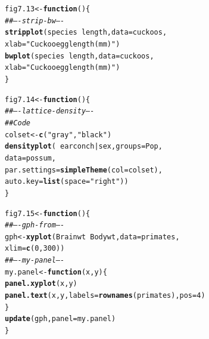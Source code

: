 \documentclass[12pt, a4paper,  BCOR=8.25mm, DIV=15]{scrartcl}\usepackage[]{graphicx}\usepackage[]{color}
\makeatletter
\newcommand{\hlnum}[1]{\textcolor[rgb]{0.686,0.059,0.569}{#1}}%
\newcommand{\hlstr}[1]{\textcolor[rgb]{0.192,0.494,0.8}{#1}}%
\newcommand{\hlcom}[1]{\textcolor[rgb]{0.678,0.584,0.686}{\textit{#1}}}%
\newcommand{\hlopt}[1]{\textcolor[rgb]{0,0,0}{#1}}%
\newcommand{\hlstd}[1]{\textcolor[rgb]{0.345,0.345,0.345}{#1}}%
\newcommand{\hlkwa}[1]{\textcolor[rgb]{0.161,0.373,0.58}{\textbf{#1}}}%
\newcommand{\hlkwb}[1]{\textcolor[rgb]{0.69,0.353,0.396}{#1}}%
\newcommand{\hlkwc}[1]{\textcolor[rgb]{0.333,0.667,0.333}{#1}}%
\newcommand{\hlkwd}[1]{\textcolor[rgb]{0.737,0.353,0.396}{\textbf{#1}}}%
\newenvironment{kframe}{%
 \def\at@end@of@kframe{}%
 \ifinner\ifhmode%
  \def\at@end@of@kframe{\end{minipage}}%
  \begin{minipage}{\columnwidth}%
 \fi\fi%
 \def\FrameCommand##1{\hskip\@totalleftmargin \hskip-\fboxsep
 \colorbox{shadecolor}{##1}\hskip-\fboxsep
     \hskip-\linewidth \hskip-\@totalleftmargin \hskip\columnwidth}%
 \MakeFramed {\advance\hsize-\width
   \@totalleftmargin\z@ \linewidth\hsize
   \@setminipage}}%
 {\par\unskip\endMakeFramed%
 \at@end@of@kframe}
\newenvironment{knitrout}{}{} %
\makeatother
\begin{document}
\begin{knitrout}
\color{fgcolor}\begin{kframe}
\begin{alltt}
\hlstd{fig7.13} \hlkwb{<-} \hlkwa{function}\hlstd{()\{}
\hlcom{## ---- strip-bw ----}
\hlkwd{stripplot}\hlstd{(species} \hlopt{~} \hlstd{length,} \hlkwc{data}\hlstd{=cuckoos,}
          \hlkwc{xlab}\hlstd{=}\hlstr{"Cuckoo egg length (mm)"}\hlstd{)}
\hlkwd{bwplot}\hlstd{(species} \hlopt{~} \hlstd{length,} \hlkwc{data}\hlstd{=cuckoos,}
       \hlkwc{xlab}\hlstd{=}\hlstr{"Cuckoo egg length (mm)"}\hlstd{)}
\hlstd{\}}
\end{alltt}
\end{kframe}
\end{knitrout}

\begin{knitrout}
\color{fgcolor}\begin{kframe}
\begin{alltt}
\hlstd{fig7.14} \hlkwb{<-} \hlkwa{function}\hlstd{()\{}
\hlcom{## ---- lattice-density ----}
\hlcom{## Code}
\hlstd{colset} \hlkwb{<-} \hlkwd{c}\hlstd{(}\hlstr{"gray"}\hlstd{,}\hlstr{"black"}\hlstd{)}
\hlkwd{densityplot}\hlstd{(}\hlopt{~} \hlstd{earconch} \hlopt{|} \hlstd{sex,} \hlkwc{groups}\hlstd{=Pop,}
            \hlkwc{data}\hlstd{=possum,}
            \hlkwc{par.settings}\hlstd{=}\hlkwd{simpleTheme}\hlstd{(}\hlkwc{col}\hlstd{=colset),}
            \hlkwc{auto.key}\hlstd{=}\hlkwd{list}\hlstd{(}\hlkwc{space}\hlstd{=}\hlstr{"right"}\hlstd{))}
\hlstd{\}}
\end{alltt}
\end{kframe}
\end{knitrout}

\begin{knitrout}
\color{fgcolor}\begin{kframe}
\begin{alltt}
\hlstd{fig7.15} \hlkwb{<-} \hlkwa{function}\hlstd{()\{}
\hlcom{## ---- gph-from ----}
\hlstd{gph} \hlkwb{<-} \hlkwd{xyplot}\hlstd{(Brainwt} \hlopt{~} \hlstd{Bodywt,}  \hlkwc{data}\hlstd{=primates,}
              \hlkwc{xlim}\hlstd{=}\hlkwd{c}\hlstd{(}\hlnum{0}\hlstd{,}\hlnum{300}\hlstd{))}
\hlcom{## ---- my-panel ----}
\hlstd{my.panel} \hlkwb{<-} \hlkwa{function}\hlstd{(}\hlkwc{x}\hlstd{,}\hlkwc{y}\hlstd{)\{}
  \hlkwd{panel.xyplot}\hlstd{(x,y)}
  \hlkwd{panel.text}\hlstd{(x,y,} \hlkwc{labels}\hlstd{=}\hlkwd{rownames}\hlstd{(primates),} \hlkwc{pos}\hlstd{=}\hlnum{4}\hlstd{)}
\hlstd{\}}
\hlkwd{update}\hlstd{(gph,} \hlkwc{panel}\hlstd{=my.panel)}
\hlstd{\}}
\end{alltt}
\end{kframe}
\end{knitrout}
\end{document}
